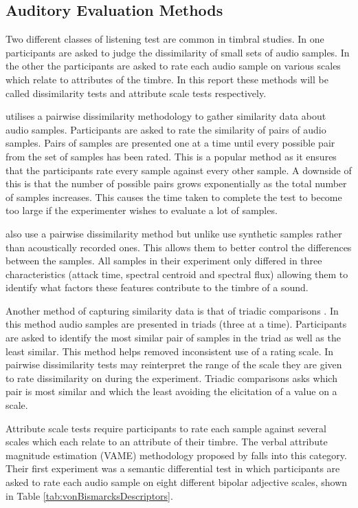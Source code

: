 	\subsection{Auditory Evaluation Methods}
	\label{sec:Timbre-Parameterisation-AuditoryEvaluation}
		Two different classes of listening test are common in timbral studies. In one participants are asked to
		judge the dissimilarity of small sets of audio samples. In the other the participants are asked to rate each
		audio sample on various scales which relate to attributes of the timbre. In this report these methods will
		be called dissimilarity tests and attribute scale tests respectively.

		\citet{grey1977multidimensional} utilises a pairwise dissimilarity methodology to gather similarity data
		about audio samples.  Participants are asked to rate the similarity of pairs of audio samples. Pairs of
		samples are presented one at a time until every possible pair from the set of samples has been rated. This
		is a popular method as it ensures that the participants rate every sample against every other sample. A
		downside of this is that the number of possible pairs grows exponentially as the total number of samples
		increases. This causes the time taken to complete the test to become too large if the experimenter wishes to
		evaluate a lot of samples.

		\citet{caclin2005acoustic} also use a pairwise dissimilarity method but unlike
		\citet{grey1977multidimensional} use synthetic samples rather than acoustically recorded ones. This allows
		them to better control the differences between the samples. All samples in their experiment only differed in
		three characteristics (attack time, spectral centroid and spectral flux) allowing them to identify what
		factors these features contribute to the timbre of a sound.

		Another method of capturing similarity data is that of triadic comparisons \citep{wickelmaier2007deriving}.
		In this method audio samples are presented in triads (three at a time).  Participants are asked to identify
		the most similar pair of samples in the triad as well as the least similar. This method helps removed
		inconsistent use of a rating scale. In pairwise dissimilarity tests may reinterpret the range of the scale
		they are given to rate dissimilarity on during the experiment. Triadic comparisons asks which pair is most
		similar and which the least avoiding the elicitation of a value on a scale.

		Attribute scale tests require participants to rate each sample against several scales which each relate to
		an attribute of their timbre. The verbal attribute magnitude estimation (VAME) methodology proposed by
		\citet{kendall1993verbal1} falls into this category. Their first experiment was a semantic differential test
		in which participants are asked to rate each audio sample on eight different bipolar adjective scales, shown
		in Table \ref{tab:vonBismarcksDescriptors}.

